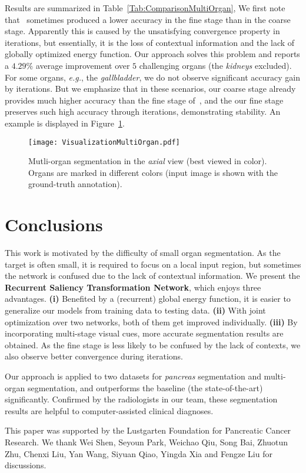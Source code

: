 \documentclass[10pt,twocolumn,letterpaper]{article}
\begin{document}
Results are summarized in Table~\ref{Tab:ComparisonMultiOrgan},
We first note that~\cite{Zhou_2017_Fixed} sometimes produced a lower accuracy in the fine stage than in the coarse stage.
Apparently this is caused by the unsatisfying convergence property in iterations,
but essentially, it is the loss of contextual information and the lack of globally optimized energy function.
Our approach solves this problem and reports a $4.29\%$ average improvement over $5$ challenging organs (the {\em kidneys} excluded).
For some organs, {\em e.g.}, the {\em gallbladder}, we do not observe significant accuracy gain by iterations.
But we emphasize that in these scenarios,
our coarse stage already provides much higher accuracy than the fine stage of~\cite{Zhou_2017_Fixed},
and the our fine stage preserves such high accuracy through iterations, demonstrating stability.
An example is displayed in Figure~\ref{Fig:VisualizationMultiOrgan}.

\renewcommand{\figurewidth}{8.0cm}
\begin{figure}[t]
\begin{center}
    \texttt{[image: VisualizationMultiOrgan.pdf]}
\end{center}
\caption{
    Mutli-organ segmentation in the {\em axial} view (best viewed in color).
    Organs are marked in different colors (input image is shown with the ground-truth annotation).
}
\label{Fig:VisualizationMultiOrgan}
\end{figure}


\section{Conclusions}
\label{Conclusions}

This work is motivated by the difficulty of small organ segmentation.
As the target is often small, it is required to focus on a local input region,
but sometimes the network is confused due to the lack of contextual information.
We present the {\bf Recurrent Saliency Transformation Network}, which enjoys three advantages.
{\bf (i)} Benefited by a (recurrent) global energy function, it is easier to generalize our models from training data to testing data.
{\bf (ii)} With joint optimization over two networks, both of them get improved individually.
{\bf (iii)} By incorporating multi-stage visual cues, more accurate segmentation results are obtained.
As the fine stage is less likely to be confused by the lack of contexts, we also observe better convergence during iterations.

Our approach is applied to two datasets for {\em pancreas} segmentation and multi-organ segmentation,
and outperforms the baseline (the state-of-the-art) significantly.
Confirmed by the radiologists in our team, these segmentation results are helpful to computer-assisted clinical diagnoses.


\vspace{0.2cm}
This paper was supported by the Lustgarten Foundation for Pancreatic Cancer Research.
We thank Wei Shen, Seyoun Park, Weichao Qiu,
Song Bai, Zhuotun Zhu, Chenxi Liu, Yan Wang, Siyuan Qiao, Yingda Xia and Fengze Liu for discussions.


{\small


}
\end{document}
